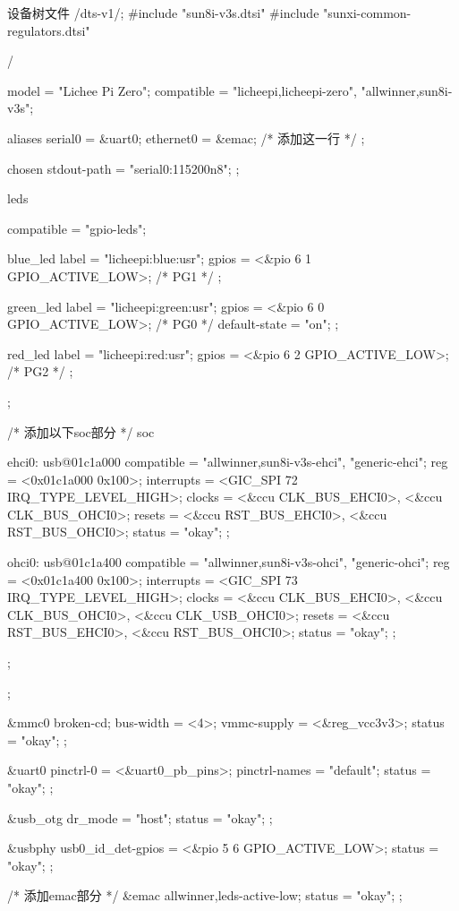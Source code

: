 \documentclass[lang=cn,newtx,10pt,scheme=chinese]{elegantbook}
\begin{document}
\begin{mycode}{设备树文件}
/dts-v1/;
#include "sun8i-v3s.dtsi"
#include "sunxi-common-regulators.dtsi"

/ {
    model = "Lichee Pi Zero";
    compatible = "licheepi,licheepi-zero", "allwinner,sun8i-v3s";

    aliases {
        serial0 = &uart0;
        ethernet0 = &emac; /* 添加这一行 */
    };

    chosen {
        stdout-path = "serial0:115200n8";
    };

    leds {
        compatible = "gpio-leds";

        blue_led {
            label = "licheepi:blue:usr";
            gpios = <&pio 6 1 GPIO_ACTIVE_LOW>; /* PG1 */
        };

        green_led {
            label = "licheepi:green:usr";
            gpios = <&pio 6 0 GPIO_ACTIVE_LOW>; /* PG0 */
            default-state = "on";
        };

        red_led {
            label = "licheepi:red:usr";
            gpios = <&pio 6 2 GPIO_ACTIVE_LOW>; /* PG2 */
        };
    };

  /* 添加以下soc部分 */
    soc {
        ehci0: usb@01c1a000 {
            compatible = "allwinner,sun8i-v3s-ehci", "generic-ehci";
            reg = <0x01c1a000 0x100>;
            interrupts = <GIC_SPI 72 IRQ_TYPE_LEVEL_HIGH>;
            clocks = <&ccu CLK_BUS_EHCI0>, <&ccu CLK_BUS_OHCI0>;
            resets = <&ccu RST_BUS_EHCI0>, <&ccu RST_BUS_OHCI0>;
            status = "okay";
        };

        ohci0: usb@01c1a400 {
            compatible = "allwinner,sun8i-v3s-ohci", "generic-ohci";
            reg = <0x01c1a400 0x100>;
            interrupts = <GIC_SPI 73 IRQ_TYPE_LEVEL_HIGH>;
            clocks = <&ccu CLK_BUS_EHCI0>, <&ccu CLK_BUS_OHCI0>,
            <&ccu CLK_USB_OHCI0>;
            resets = <&ccu RST_BUS_EHCI0>, <&ccu RST_BUS_OHCI0>;
            status = "okay";
        };
    };
};

&mmc0 {
    broken-cd;
    bus-width = <4>;
    vmmc-supply = <&reg_vcc3v3>;
    status = "okay";
};

&uart0 {
    pinctrl-0 = <&uart0_pb_pins>;
    pinctrl-names = "default";
    status = "okay";
};

&usb_otg {
    dr_mode = "host";
    status = "okay";
};

&usbphy {
    usb0_id_det-gpios = <&pio 5 6 GPIO_ACTIVE_LOW>;
    status = "okay";
};

/* 添加emac部分 */
&emac {
    allwinner,leds-active-low;
    status = "okay";
};
\end{mycode}
\end{document}
